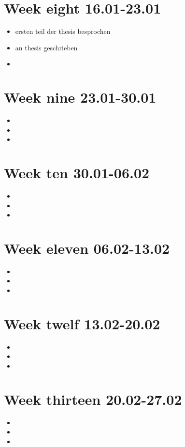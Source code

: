 \section{Week eight 16.01-23.01}
\begin{itemize}
\item ersten teil der thesis besprochen
\item an thesis geschrieben
\item 
\end{itemize}

\section{Week nine 23.01-30.01}
\begin{itemize}
\item 
\item 
\item 
\end{itemize}

\section{Week ten 30.01-06.02}
\begin{itemize}
\item 
\item 
\item 
\end{itemize}

\section{Week eleven 06.02-13.02}
\begin{itemize}
\item 
\item 
\item 
\end{itemize}

\section{Week twelf 13.02-20.02}
\begin{itemize}
\item 
\item 
\item 
\end{itemize}

\section{Week thirteen 20.02-27.02}
\begin{itemize}
\item 
\item 
\item 
\end{itemize}
